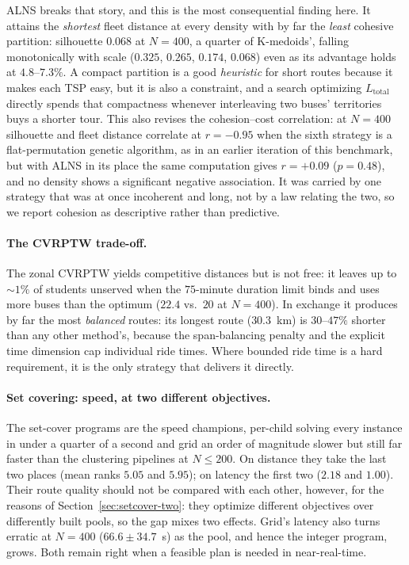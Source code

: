 \documentclass[graybox]{SNmult}
\begin{document}
ALNS breaks that story, and this is the most consequential finding here.
It attains the \emph{shortest} fleet distance at every density with by far
the \emph{least} cohesive partition: silhouette $0.068$ at $N=400$, a
quarter of K-medoids', falling monotonically with scale ($0.325$, $0.265$,
$0.174$, $0.068$) even as its advantage holds at $4.8$--$7.3\%$. A compact
partition is a good \emph{heuristic} for short routes because it makes
each TSP easy, but it is also a constraint, and a search optimizing
$L_{\mathrm{total}}$ directly spends that compactness whenever
interleaving two buses' territories buys a shorter tour. This also revises
the cohesion--cost correlation: at $N{=}400$ silhouette and fleet distance
correlate at $r=-0.95$ when the sixth strategy is a flat-permutation
genetic algorithm, as in an earlier iteration of this benchmark, but with
ALNS in its place the same computation gives $r=+0.09$ ($p=0.48$), and no
density shows a significant negative association. It was carried by one
strategy that was at once incoherent and long, not by a law relating the
two, so we report cohesion as descriptive rather than predictive.

\paragraph{The CVRPTW trade-off.}
The zonal CVRPTW yields competitive distances but is not free: it leaves
up to ${\sim}1\%$ of students unserved when the $75$-minute duration limit
binds and uses more buses than the optimum ($22.4$ vs.\ $20$ at $N=400$).
In exchange it produces by far the most \emph{balanced} routes: its
longest route ($30.3$~km) is $30$--$47\%$ shorter than any other method's,
because the span-balancing penalty and the explicit time dimension cap
individual ride times. Where bounded ride time is a hard requirement, it
is the only strategy that delivers it directly.

\paragraph{Set covering: speed, at two different objectives.}
The set-cover programs are the speed champions, per-child solving every
instance in under a quarter of a second and grid an order of magnitude
slower but still far faster than the clustering pipelines at $N\le200$. On
distance they take the last two places (mean ranks $5.05$ and $5.95$); on
latency the first two ($2.18$ and $1.00$). Their route quality should not
be compared with each other, however, for the reasons of
Section~\ref{sec:setcover-two}: they optimize different objectives over
differently built pools, so the gap mixes two effects. Grid's latency also
turns erratic at $N=400$ ($66.6\pm34.7$~s) as the pool, and hence the
integer program, grows. Both remain right when a feasible plan is needed
in near-real-time.
\end{document}
